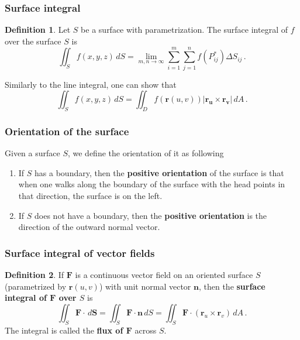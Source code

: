 \documentclass[
]{article}
\theoremstyle{definition}
\newtheorem{definition}{Definition}[section]
\theoremstyle{definition}
\theoremstyle{definition}
\theoremstyle{definition}
\theoremstyle{remark}
\begin{document}
\subsubsection{Surface integral}\label{surface-integral}

\begin{definition}
Let \(S\) be a surface with parametrization.
The surface integral of \(f\) over the surface \(S\) is
\begin{equation*}
    \iint_S f(x,y,z) \, dS = \lim_{m,n\to \infty} \sum_{i=1}^m \sum_{j=1}^n f(P_{ij}^*) \Delta S_{ij} \,.
\end{equation*}
\end{definition}

Similarly to the line integral,
one can show that
\begin{equation*}
   \iint_S f(x,y,z) \, dS  = \iint_D f(\mathbf{r}(u,v)) | \mathbf{r_u}\times \mathbf{r_v} | \, dA \,. 
\end{equation*}

\subsubsection{Orientation of the surface}\label{orientation-of-the-surface}

Given a surface \(S\), we define the orientation of it as following

\begin{enumerate}
\def\labelenumi{\arabic{enumi}.}
\item
  If \(S\) has a boundary, then the \textbf{positive orientation} of the surface is that
  when one walks along the boundary of the surface with the head points in that direction, the surface is on the left.
\item
  If \(S\) does not have a boundary, then the \textbf{positive orientation} is the direction of the outward normal vector.
\end{enumerate}

\subsubsection{Surface integral of vector fields}\label{surface-integral-of-vector-fields}

\begin{definition}
If \(\mathbf{F}\) is a continuous vector field on an oriented surface \(S\) (parametrized by \(\mathbf{r}(u,v)\))
with unit normal vector \(\mathbf{n}\), then the \textbf{surface integral of \(\mathbf{F}\) over
\(S\)} is
\begin{equation*}
    \iint_S \mathbf{F}\cdot \, d\mathbf{S} = \iint_S \mathbf{F}\cdot \mathbf{n} \, dS 
    = \iint_S \mathbf{F}\cdot (\mathbf{r}_u\times \mathbf{r}_v) \, dA \,.
\end{equation*}
The integral is called the \textbf{flux of \(\mathbf{F}\)} across \(S\).
\end{definition}
\end{document}
